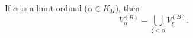 If $\alpha$ is a limit ordinal ($\alpha \in K_{\Pi}$), then
$$V_{\alpha}^{(B)} = \bigcup_{\xi < \alpha} V_{\xi}^{(B)}.$$
